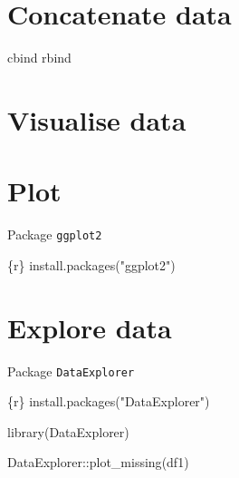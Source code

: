 \documentclass[
  letterpaper,
  DIV=11,
  numbers=noendperiod,
  oneside]{scrreprt}
\newenvironment{Shaded}{\begin{snugshade}}{\end{snugshade}}
\newcommand{\FunctionTok}[1]{\textcolor[rgb]{0.28,0.35,0.67}{#1}}
\newcommand{\InformationTok}[1]{\textcolor[rgb]{0.37,0.37,0.37}{#1}}
\newcommand{\NormalTok}[1]{\textcolor[rgb]{0.00,0.23,0.31}{#1}}
\newcommand{\SpecialCharTok}[1]{\textcolor[rgb]{0.37,0.37,0.37}{#1}}
\newcommand{\StringTok}[1]{\textcolor[rgb]{0.13,0.47,0.30}{#1}}
\begin{document}
\hypertarget{concatenate-data}{%
\section{Concatenate data}\label{concatenate-data}}

cbind rbind

\hypertarget{visualise-data}{%
\section{Visualise data}\label{visualise-data}}

\hypertarget{plot}{%
\section{Plot}\label{plot}}

Package \texttt{ggplot2}

\begin{Shaded}
\begin{Highlighting}[]
\InformationTok{\textasciigrave{}\textasciigrave{}\textasciigrave{}\{r\}}
\FunctionTok{install.packages}\NormalTok{(}\StringTok{"ggplot2"}\NormalTok{)}
\InformationTok{\textasciigrave{}\textasciigrave{}\textasciigrave{}}
\end{Highlighting}
\end{Shaded}

\hypertarget{explore-data}{%
\section{Explore data}\label{explore-data}}

Package \texttt{DataExplorer}

\begin{Shaded}
\begin{Highlighting}[]
\InformationTok{\textasciigrave{}\textasciigrave{}\textasciigrave{}\{r\}}
\FunctionTok{install.packages}\NormalTok{(}\StringTok{"DataExplorer"}\NormalTok{)}
\InformationTok{\textasciigrave{}\textasciigrave{}\textasciigrave{}}
\end{Highlighting}
\end{Shaded}

\begin{Shaded}
\begin{Highlighting}[]
\FunctionTok{library}\NormalTok{(DataExplorer)}
\end{Highlighting}
\end{Shaded}

\begin{Shaded}
\begin{Highlighting}[]
\NormalTok{DataExplorer}\SpecialCharTok{::}\FunctionTok{plot\_missing}\NormalTok{(df1)}
\end{Highlighting}
\end{Shaded}
\end{document}
